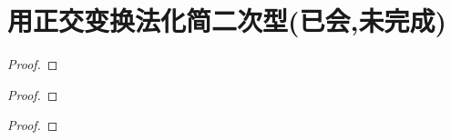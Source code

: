 \documentclass[../../main.tex]{subfiles}
\begin{document}
\section{用正交变换法化简二次型(已会,未完成)}

\begin{proposition}\label{proposition:例9.48}

\end{proposition}
\begin{proof}

\end{proof}

\begin{proposition}\label{proposition:例9.49}

\end{proposition}
\begin{proof}

\end{proof}

\begin{proposition}\label{proposition:例9.50}

\end{proposition}
\begin{proof}

\end{proof}
\end{document}
